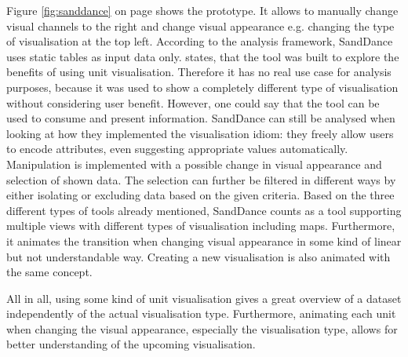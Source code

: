 Figure \ref{fig:sanddance} on page \pageref{fig:sanddance} shows the prototype. It allows to manually change visual channels to the right and change visual appearance e.g. changing the type of visualisation at the top left. According to the analysis framework, SandDance uses static tables as input data only. \citeauthor{Drucker2015} states, that the tool was built to explore the benefits of using unit visualisation. Therefore it has no real use case for analysis purposes, because it was used to show a completely different type of visualisation without considering user benefit. However, one could say that the tool can be used to consume and present information.
SandDance can still be analysed when looking at how they implemented the visualisation idiom: they freely allow users to encode attributes, even suggesting appropriate values automatically. Manipulation is implemented with a possible change in visual appearance and selection of shown data. The selection can further be filtered in different ways by either isolating or excluding data based on the given criteria.
Based on the three different types of tools already mentioned, SandDance counts as a tool supporting multiple views with different types of visualisation including maps. Furthermore, it animates the transition when changing visual appearance in some kind of linear but not understandable way. Creating a new visualisation is also animated with the same concept.

\cbstart
All in all, using some kind of unit visualisation gives a great overview of a dataset independently of the actual visualisation type. Furthermore, animating each unit when changing the visual appearance, especially the visualisation type, allows for better understanding of the upcoming visualisation.
\cbend